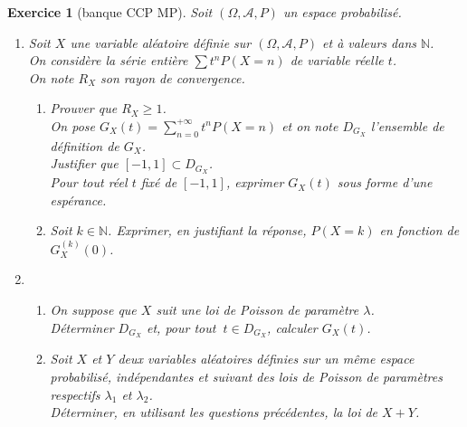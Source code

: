 \documentclass[12pt,a4paper]{article}
\newtheorem{Exo}{Exercice}
\begin{document}
\begin{Exo}[banque CCP MP]
	Soit $(\Omega,\mathcal{A},P)$ un espace probabilisé.\\
	
	\begin{enumerate}
		\item 
		Soit $X$ une variable aléatoire définie sur  $(\Omega,\mathcal{A},P)$ et à valeurs dans $\mathbb{N}$.\\
		On considère la série entière  $\displaystyle\sum t^nP(X=n)$ de variable réelle $t$.\\
		On note $R_X$ son rayon de convergence.\\
		\begin{enumerate}
			\item 
			Prouver que $R_X\geqslant 1$.\:\:\:\:\\
			On pose  $G_X(t)=\displaystyle\sum\limits_ {n=0}^{+\infty}t^nP(X=n)$ et on  note $D_{G_X}$ l'ensemble de définition de $G_X$.\\
			Justifier que   $\left[-1,1 \right] \subset D_{G_X}$.\:\:\:\:\\
			
			Pour tout réel $t$ fixé de $\left[-1,1 \right]$, exprimer $G_X(t)$ sous forme d'une espérance.\:\:\:\:
			\item
			Soit $k\in\mathbb{N}$.
			Exprimer, en justifiant la réponse, $P(X=k)$ en fonction de  $G_X^{(k)}(0)$.\:\:\:\:
			
		\end{enumerate}
		\item 
		\begin{enumerate}
			\item
			On suppose que $X$ suit une loi de Poisson de paramètre $\lambda$.\\
			Déterminer $D_{G_X}$ et, pour tout $\:t\in D_{G_X}$, calculer $G_X(t)$.\:\:\:\:
			
			
			\item
			Soit $X$ et $Y$ deux variables aléatoires définies sur un même espace probabilisé, indépendantes  et suivant des lois de Poisson de paramètres respectifs $\lambda_1$ et $\lambda_2$.\\
			Déterminer, en utilisant les questions précédentes, la loi de $X+Y$.
		\end{enumerate}
	\end{enumerate}
\end{Exo}
\end{document}
